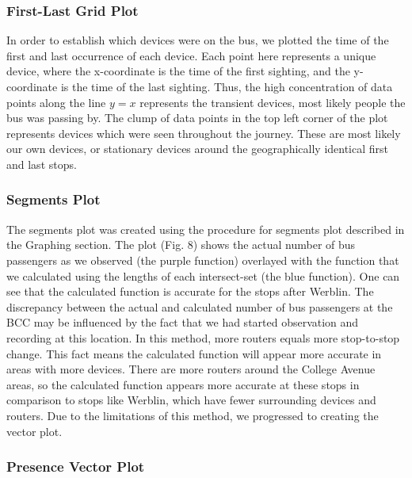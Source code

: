 \subsubsection*{First-Last Grid Plot}

In order to establish which devices were on the bus, we plotted the time of the first and last occurrence of each device.
Each point here represents a unique device, where the x-coordinate is the time of the first sighting, and the y-coordinate is the time of the last sighting.
Thus, the high concentration of data points along the line \(y=x\) represents the transient devices, most likely people the bus was passing by.
The clump of data points in the top left corner of the plot represents devices which were seen throughout the journey.
These are most likely our own devices, or stationary devices around the geographically identical first and last stops.

\subsubsection*{Segments Plot}
The segments plot was created using the procedure for segments plot described in the Graphing section. The plot (Fig. 8) shows the actual number of bus passengers as we observed (the purple function) overlayed
with the function that we calculated using the lengths of each intersect-set (the blue function). One can see that the calculated function is accurate for the stops after Werblin.
The discrepancy between the actual and calculated number of bus passengers at the BCC may be influenced by the fact that we had started observation and recording at this location. In this method, more routers
equals more stop-to-stop change. This fact means the calculated function will appear more accurate in areas with more devices. There are more routers around the College Avenue areas, so the calculated function
appears more accurate at these stops in comparison to stops like Werblin, which have fewer surrounding devices and routers. Due to the limitations of this method, we progressed to creating the vector plot.

\subsubsection*{Presence Vector Plot}


